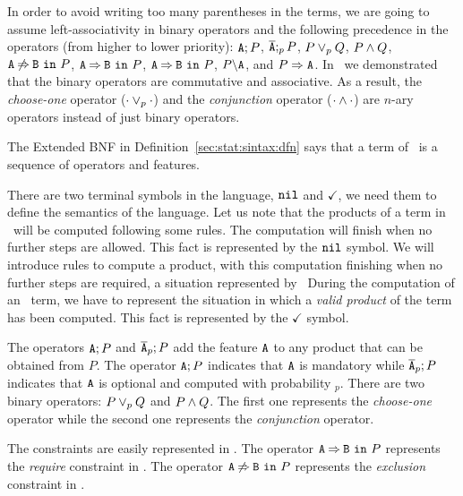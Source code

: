 In order to avoid writing too many parentheses in the terms, we are
going to assume left-associativity in binary operators and  the
following precedence in the operators (from higher to lower priority):
$\feature{A};P$, $\ofeature{A};_{p} P$, $ P \choice_{p} Q$, $P\paral Q$,
$\exclude{A}{B}{P}$, $\require{A}{B}{P}$, 
$\require{A}{B}{P}$,  $\forbid{A}{P}$, and $\mandatory{A}{P}$.
In~\cite{acl13,clc16} we demonstrated that
the binary
operators are commutative and associative.
As a result, the
\emph{choose-one} operator ($\cdot\choice_{p}\cdot$) and the
\emph{conjunction} operator ($\cdot\paral\cdot$) are $n$-ary operators
instead of just binary operators. 


The Extended BNF in Definition~\ref{sec:stat:sintax:dfn} says
that a term of \fodaPA\ is
a sequence of operators and features.

There are two terminal symbols in
the language, $\nil$ and $\checkmark$,
we need them to define the semantics of the language.
Let us note that the products of a term in \fodaPA\ will be computed following some rules.
The computation will finish when no further steps are allowed. 
This fact is represented by the $\nil$ symbol. 
We will introduce rules to compute a product, with this computation
finishing when no further steps are required, a situation represented by~\nil
During the computation of an \fodaPAp\ term,  we have 
to represent the situation in which a \emph{valid product} 
of the term has been computed. 
This fact is represented by the $\checkmark$ symbol.

The operators $\feature{A};P$ and $\ofeature{A}_{p};P$ add the feature $\feature{A}$ to any product that can be obtained
from $P$. The operator $\feature{A};P$ indicates that $\feature{A}$ is mandatory while $\ofeature{A}_{p};P$ indicates
that $\feature{A}$ is optional and computed with probability $_{p}$.
There are two binary operators: $P \choice_{p} Q$ and $P\paral Q$. The
first one represents the \emph{choose-one} operator while the second one represents the  \emph{conjunction} operator.

The constraints are easily represented in \fodaPAp.
The operator $\require{A}{B}{P}$ represents the \emph{require}
constraint in \FODA.
The operator $\exclude{A}{B}{P}$ represents the \emph{exclusion}
constraint in \FODA.  

